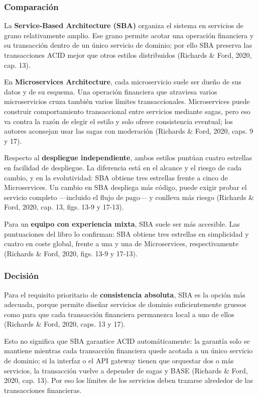 \subsubsection{Comparación}

La \textbf{Service-Based Architecture (SBA)} organiza el sistema en servicios de grano
relativamente amplio. Ese grano permite acotar una operación financiera y su
transacción dentro de un único servicio de dominio; por ello SBA preserva las
transacciones ACID mejor que otros estilos distribuidos (Richards \& Ford, 2020,
cap. 13).

En \textbf{Microservices Architecture}, cada microservicio suele ser dueño de sus datos
y de su esquema. Una operación financiera que atraviesa varios microservicios
cruza también varios límites transaccionales. Microservices puede construir
comportamiento transaccional entre servicios mediante sagas, pero eso va contra la
razón de elegir el estilo y solo ofrece consistencia eventual; los autores
aconsejan usar las sagas con moderación (Richards \& Ford, 2020, caps. 9 y 17).

Respecto al \textbf{despliegue independiente}, ambos estilos puntúan cuatro estrellas
en facilidad de despliegue. La diferencia está en el alcance y el riesgo de cada
cambio, y en la evolutividad: SBA obtiene tres estrellas frente a cinco de
Microservices. Un cambio en SBA despliega más código, puede exigir probar el
servicio completo ---incluido el flujo de pago--- y conlleva más riesgo (Richards \&
Ford, 2020, cap. 13, figs. 13-9 y 17-13).

Para un \textbf{equipo con experiencia mixta}, SBA suele ser más accesible. Las
puntuaciones del libro lo confirman: SBA obtiene tres estrellas en simplicidad y
cuatro en coste global, frente a una y una de Microservices, respectivamente
(Richards \& Ford, 2020, figs. 13-9 y 17-13).

\subsubsection{Decisión}

Para el requisito prioritario de \textbf{consistencia absoluta}, SBA es la opción más
adecuada, porque permite diseñar servicios de dominio suficientemente gruesos
como para que cada transacción financiera permanezca local a uno de ellos
(Richards \& Ford, 2020, caps. 13 y 17).

Esto no significa que SBA garantice ACID automáticamente: la garantía solo se
mantiene mientras cada transacción financiera quede acotada a un único servicio de
dominio; si la interfaz o el API gateway tienen que orquestar dos o más servicios,
la transacción vuelve a depender de sagas y BASE (Richards \& Ford, 2020, cap. 13).
Por eso los límites de los servicios deben trazarse alrededor de las transacciones
financieras.
